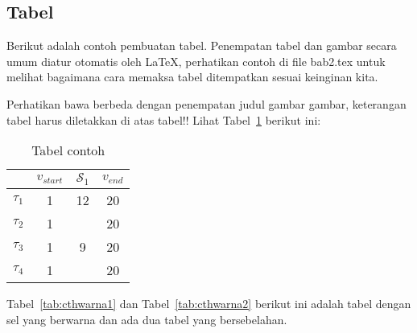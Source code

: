 
\subsection{Tabel}  
Berikut adalah contoh pembuatan tabel. 
Penempatan tabel dan gambar secara umum diatur otomatis oleh \LaTeX{}, perhatikan contoh di file bab2.tex untuk melihat bagaimana cara memaksa tabel ditempatkan sesuai keinginan kita.

Perhatikan bawa berbeda dengan penempatan judul gambar gambar, keterangan tabel harus diletakkan di atas tabel!!
Lihat Tabel~\ref{tab:contoh1} berikut ini:

\begin{table}[H] %
	\centering 
	\caption{Tabel contoh}
	\label{tab:contoh1}
	\begin{tabular}{cccc}
		\toprule
		& $v_{start}$ & $\mathcal{S}_{1}$ & $v_{end}$\\

		\midrule
		$\tau_{1}$ & 1 & 12& 20\\
		$\tau_{2}$ & 1 &  & 20\\
		$\tau_{3}$ & 1 & 9 & 20\\
		$\tau_{4}$ & 1 &  & 20\\

		\bottomrule
		
	\end{tabular} 
\end{table}
Tabel~\ref{tab:cthwarna1} dan Tabel~\ref{tab:cthwarna2} berikut ini adalah tabel dengan sel yang berwarna dan ada dua tabel yang bersebelahan. 
